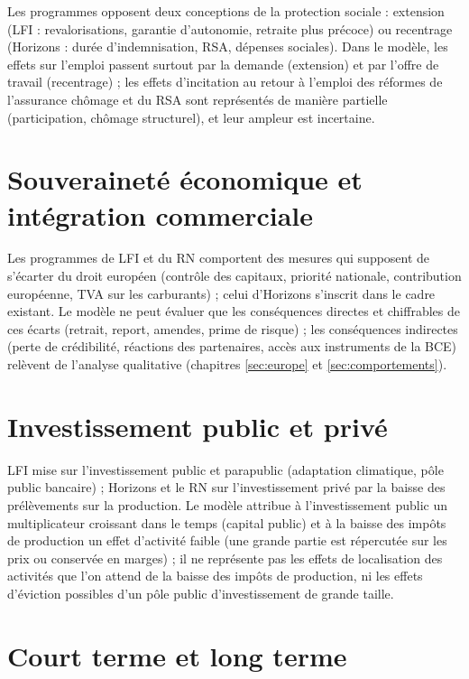 \documentclass[
  11pt,
  11pt,
  a4paper,
  openany]{book}
\begin{document}
Les programmes opposent deux conceptions de la protection sociale :
extension (LFI : revalorisations, garantie d'autonomie, retraite plus
précoce) ou recentrage (Horizons : durée d'indemnisation, RSA, dépenses
sociales). Dans le modèle, les effets sur l'emploi passent surtout par
la demande (extension) et par l'offre de travail (recentrage) ; les
effets d'incitation au retour à l'emploi des réformes de l'assurance
chômage et du RSA sont représentés de manière partielle (participation,
chômage structurel), et leur ampleur est incertaine.

\hypertarget{sec:souverainete}{%
\section{Souveraineté économique et intégration
commerciale}\label{sec:souverainete}}

Les programmes de LFI et du RN comportent des mesures qui supposent de
s'écarter du droit européen (contrôle des capitaux, priorité nationale,
contribution européenne, TVA sur les carburants) ; celui d'Horizons
s'inscrit dans le cadre existant. Le modèle ne peut évaluer que les
conséquences directes et chiffrables de ces écarts (retrait, report,
amendes, prime de risque) ; les conséquences indirectes (perte de
crédibilité, réactions des partenaires, accès aux instruments de la BCE)
relèvent de l'analyse qualitative (chapitres \ref{sec:europe} et
\ref{sec:comportements}).

\hypertarget{sec:invest}{%
\section{Investissement public et privé}\label{sec:invest}}

LFI mise sur l'investissement public et parapublic (adaptation
climatique, pôle public bancaire) ; Horizons et le RN sur
l'investissement privé par la baisse des prélèvements sur la production.
Le modèle attribue à l'investissement public un multiplicateur croissant
dans le temps (capital public) et à la baisse des impôts de production
un effet d'activité faible (une grande partie est répercutée sur les
prix ou conservée en marges) ; il ne représente pas les effets de
localisation des activités que l'on attend de la baisse des impôts de
production, ni les effets d'éviction possibles d'un pôle public
d'investissement de grande taille.

\hypertarget{sec:ct-lt}{%
\section{Court terme et long terme}\label{sec:ct-lt}}
\end{document}
